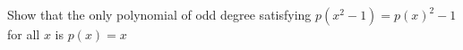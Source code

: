 Show that the only polynomial of odd degree satisfying $p(x^2-1) = p(x)^2 - 1$ for all $x$ is $p(x) = x$